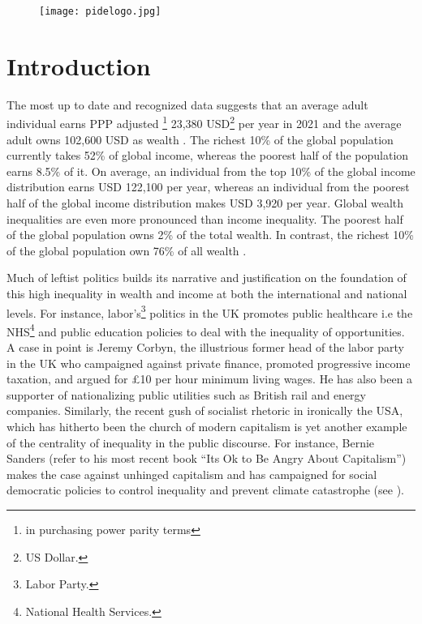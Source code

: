 \documentclass[12pt]{article}
\newcommand{\1}{\mathbbm 1}
\begin{document}
		\newpage{}
		
		\begin{figure}[H]
			\begin{center}
				\texttt{[image: pidelogo.jpg]}		
				\caption*{}
			\end{center}
		\end{figure}
		
		\vspace{-8ex}
		
		
		
		\tableofcontents
		
		\newpage{}
		
		\vspace{-8ex}
		
		
		\section{Introduction}
		
	The most up to date and recognized data suggests that an average adult individual earns PPP adjusted \footnote{in purchasing power parity terms} 23,380 USD\footnote{US Dollar.}  per  year  in  2021  and  the  average  adult  owns 102,600 USD as wealth \cite{chancel2022world}. The  richest  10\% of the global population currently takes 52\%  of  global  income,  whereas  the  poorest  half  of  the  population  earns  8.5\%  of  it. On  average,  an  individual  from  the  top  10\%  of  the global income distribution earns USD 122,100  per year, whereas an individual from  the  poorest  half  of  the  global  income  distribution  makes USD 3,920  per  year. Global  wealth  inequalities  are  even  more  pronounced  than  income  inequality. The  poorest half of the global population owns 2\% of the total wealth. In contrast, the richest 10\% of the global population own 76\% of all wealth \cite{chancel2022world}.
	
	
	
	Much of leftist politics builds its narrative and justification on the foundation of this high inequality in wealth and income at both the international and national levels. For instance, labor's\footnote{Labor Party.} politics in the UK promotes public healthcare i.e the NHS\footnote{National Health Services.} and public education policies to deal with the inequality of opportunities. A case in point is Jeremy Corbyn, the illustrious former head of the labor party in the UK who campaigned against private finance, promoted progressive income taxation, and argued for \pounds 10 per hour minimum living wages. He has also been a supporter of nationalizing public utilities such as British rail and energy companies. Similarly, the recent gush of socialist rhetoric in ironically the USA, which has hitherto been the church of modern capitalism is yet another example of the centrality of inequality in the public discourse. For instance, Bernie Sanders (refer to his most recent book ``Its Ok to Be Angry About Capitalism'') makes the case against unhinged capitalism and has campaigned for social democratic policies to control inequality and prevent climate catastrophe (see \cite{sanders2023}).
	
\end{document}
